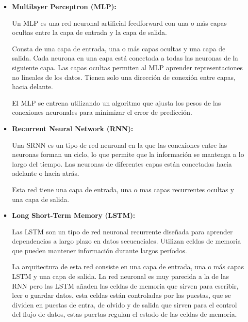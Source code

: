 \begin{itemize}

	\item
	\textbf{Multilayer Perceptron (MLP):}

	Un MLP es una red neuronal artificial feedforward con una o más capas ocultas entre la capa de entrada y la capa de salida.
	
	Consta de una capa de entrada, una o más capas ocultas y una capa de salida. Cada neurona en una capa está conectada a todas las neuronas de la siguiente capa. Las capas ocultas permiten al MLP aprender representaciones no lineales de los datos. Tienen solo una dirección de conexión entre capas, hacia delante.
	
	El MLP se entrena utilizando un algoritmo que ajusta los pesos de las conexiones neuronales para minimizar el error de predicción.
	
	

	

	\item
	\textbf{Recurrent Neural Network (RNN):}

	Una SRNN es un tipo de red neuronal en la que las conexiones entre las neuronas forman un ciclo, lo que permite que la información se mantenga a lo largo del tiempo.  Las neuronas de diferentes capas están conectadas hacia adelante o hacia atrás.

	Esta red tiene una capa de entrada, una o mas capas recurrentes ocultas y una capa de salida.
	
	



	\item
	\textbf{Long Short-Term Memory (LSTM):}

	Las LSTM son un tipo de red neuronal recurrente diseñada para aprender dependencias a largo plazo en datos secuenciales. Utilizan celdas de memoria que pueden mantener información durante largos períodos.
	
	La arquitectura de esta red consiste en una capa de entrada, una o más capas LSTM y una capa de salida. La red neuronal es muy parecida a la de las RNN pero las LSTM añaden las celdas de memoria que sirven para escribir, leer o guardar datos, esta celdas están controladas por las puestas, que se dividen en puestas de entra, de olvido y de salida que sirven para el control del flujo de datos, estas puertas regulan el estado de las celdas de memoria.


\end{itemize}


